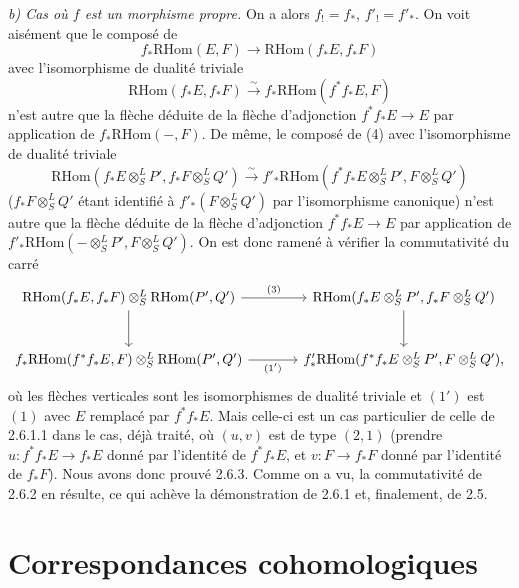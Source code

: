 \documentclass[11pt]{article}
\providecommand{\RHom}{\mathrm{RHom}}
\providecommand{\RHom}{\mathrm{RHom}}
\providecommand{\RHom}{\mathrm R\mathcal{H}om}
\providecommand{\RHom}{\mathrm{RHom}}
\begin{document}
\emph{b) Cas où $f$ est un morphisme propre.} On a alors $f_!=f_*$, $f'_!=f'_*$. On voit aisément que le composé de
\[
f_*\RHom(E,F)\longrightarrow\RHom(f_*E,f_*F)
\]
avec l'isomorphisme de dualité triviale
\[
\RHom(f_*E,f_*F)\xrightarrow{\sim}f_*\RHom(f^{*}f_*E,F)
\]
n'est autre que la flèche déduite de la flèche d'adjonction $f^{*}f_*E\to E$ par application de $f_*\RHom(-,F)$. De même, le composé de (4) avec l'isomorphisme de dualité triviale
\[
\RHom(f_*E\otimes^L_SP',f_*F\otimes^L_SQ')\xrightarrow{\sim}f'_*\RHom(f^{*}f_*E\otimes^L_SP',F\otimes^L_SQ')
\]
($f_*F\otimes^L_SQ'$ étant identifié à $f'_*(F\otimes^L_SQ')$ par l'isomorphisme canonique) n'est autre que la flèche déduite de la flèche d'adjonction $f^{*}f_*E\to E$ par application de $f'_*\RHom(-\otimes^L_SP',F\otimes^L_SQ')$. On est donc ramené à vérifier la commutativité du carré
\[
\begin{tikzcd}[column sep=large,row sep=large]
\RHom(f_*E,f_*F)\otimes^L_S\RHom(P',Q') \arrow[r,"(3)"] \arrow[d] & \RHom(f_*E\otimes^L_SP',f_*F\otimes^L_SQ') \arrow[d]\\
f_*\RHom(f^{*}f_*E,F)\otimes^L_S\RHom(P',Q') \arrow[r,"(1')"'] & f'_*\RHom(f^{*}f_*E\otimes^L_SP',F\otimes^L_SQ'),
\end{tikzcd}
\]
où les flèches verticales sont les isomorphismes de dualité triviale et $(1')$ est $(1)$ avec $E$ remplacé par $f^{*}f_*E$. Mais celle-ci est un cas particulier de celle de 2.6.1.1 dans le cas, déjà traité, où $(u,v)$ est de type $(2,1)$ (prendre $u:f^{*}f_*E\to f_*E$ donné par l'identité de $f^{*}f_*E$, et $v:F\to f_*F$ donné par l'identité de $f_*F$). Nous avons donc prouvé 2.6.3. Comme on a vu, la commutativité de 2.6.2 en résulte, ce qui achève la démonstration de 2.6.1 et, finalement, de 2.5.

\clearpage
\section{Correspondances cohomologiques}
\end{document}
